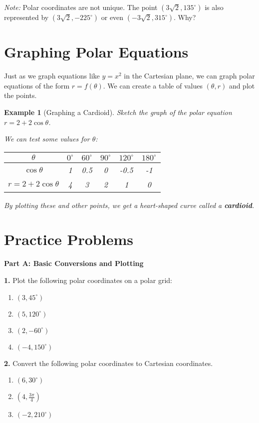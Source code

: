 \documentclass[12pt]{article}
\newtheorem{example}{Example}
\begin{document}
\textit{Note:} Polar coordinates are not unique. The point $(3\sqrt{2}, 135^\circ)$ is also represented by $(3\sqrt{2}, -225^\circ)$ or even $(-3\sqrt{2}, 315^\circ)$. Why?

\section{Graphing Polar Equations}

Just as we graph equations like $y = x^2$ in the Cartesian plane, we can graph polar equations of the form $r = f(\theta)$. We can create a table of values $(\theta, r)$ and plot the points.

\begin{example}[Graphing a Cardioid]
Sketch the graph of the polar equation $r = 2 + 2\cos\theta$.

We can test some values for $\theta$:
\begin{center}
\begin{tabular}{|c|c|c|c|c|c|}
\hline
$\theta$ & $0^\circ$ & $60^\circ$ & $90^\circ$ & $120^\circ$ & $180^\circ$ \\
\hline
$\cos\theta$ & 1 & 0.5 & 0 & -0.5 & -1 \\
\hline
$r = 2+2\cos\theta$ & 4 & 3 & 2 & 1 & 0 \\
\hline
\end{tabular}
\end{center}
By plotting these and other points, we get a heart-shaped curve called a \textbf{cardioid}.
\end{example}

\newpage

\section{Practice Problems}

\textbf{Part A: Basic Conversions and Plotting}

\textbf{1.} Plot the following polar coordinates on a polar grid:
\begin{enumerate}
    \item[(a)] $(3, 45^\circ)$
    \item[(b)] $(5, 120^\circ)$
    \item[(c)] $(2, -60^\circ)$
    \item[(d)] $(-4, 150^\circ)$
\end{enumerate}
\vspace{4cm}

\textbf{2.} Convert the following polar coordinates to Cartesian coordinates.
\begin{enumerate}
    \item[(a)] $(6, 30^\circ)$
    \vspace{2cm}
    \item[(b)] $(4, \frac{3\pi}{4})$
    \vspace{2cm}
    \item[(c)] $(-2, 210^\circ)$
    \vspace{2cm}
\end{enumerate}
\end{document}
